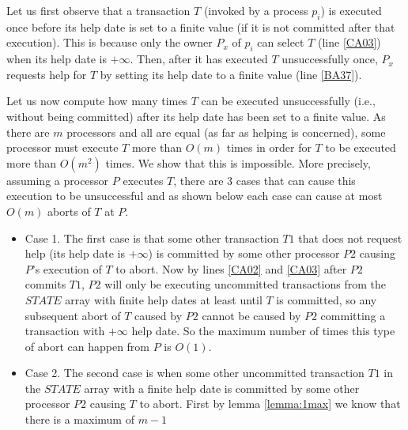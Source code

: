 \begin{proofT}
Let  us first   observe  that a  transaction  $T$  (invoked by  a process
$p_i$)  is executed once before its  help date is  set  to a finite value
(if it is not committed after that execution).
This is  because only the owner $P_x$ of $p_i$ can  select $T$
(line \ref{CA03}) when its help date is  $+\infty$.
Then, after it has  executed $T$ unsuccessfully once, $P_x$  requests
help for $T$ by setting its  help date to a finite value (line \ref{BA37}).

Let us now compute   how many  times $T$  can  be  executed unsuccessfully
(i.e.,  without being committed) after its help date has been  set to a
finite value.
As there  are  $m$   processors and all  are equal (as far as  helping is
concerned),   some  processor must execute $T$  more  than $O(m)$ times
in  order for  $T$  to be  executed more  than $O(m^2)$ times.
We show that this is impossible. More precisely,
assuming  a processor $P$ executes  $T$, there are $3$ cases that can cause
this execution to be unsuccessful  and as shown below
each case can cause at most $O(m)$ aborts of $T$ at $P$.
%
\begin{itemize}
\item
Case 1. The first case  is that some other transaction $T1$ that does
not  request help  (its help date is $+\infty$)  is committed  by some  other
processor $P2$ causing $P$'s execution of $T$ to abort.
Now by lines  \ref{CA02} and \ref{CA03} after $P2$  commits $T1$, $P2$ will
only  be executing  uncommitted transactions  from the  $\mathit{STATE}$
 array with
finite help dates at least until  $T$ is committed, so any subsequent abort
of $T$ caused  by $P2$ cannot be caused by  $P2$ committing a transaction
with $+\infty$ help date.
So the maximum  number of times this  type of abort can happen  from $P$ is
$O(1)$.
\item
Case  2. The second case  is when  some  other uncommitted transaction
$T1$ in  the $\mathit{STATE}$  array with a  finite help  date is committed
by some other processor $P2$ causing $T$ to abort.
First by  lemma \ref{lemma:1max} we know  that there is a  maximum of $m-1$

\end{itemize}
\end{proofT}

